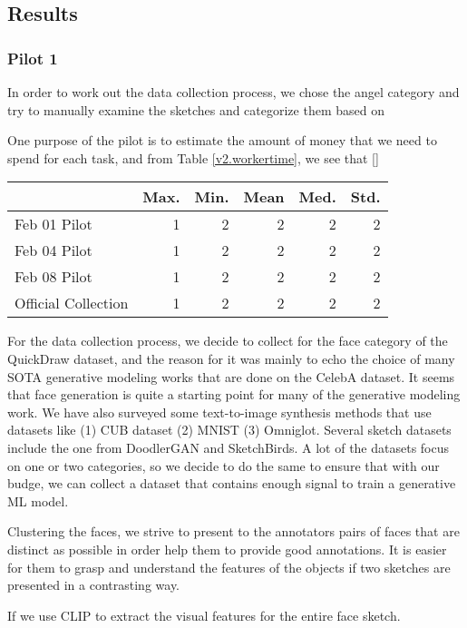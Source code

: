 
\subsection{Results}

\subsubsection{Pilot 1}
In order to work out the data collection process, we chose the angel category and try to manually examine the sketches and categorize them based on 


One purpose of the pilot is to estimate the amount of money that we need to spend for each task, and from Table \ref{v2.workertime}, we see that []
\begin{table*}[!htb]
\begin{minipage}[b]{1\textwidth}
\centering
\begin{tabular}{l|rrrrr}
\toprule
~ & Max. & Min. & Mean & Med. & Std. \\
\midrule
Feb 01 Pilot  & 1 & 2 & 2 & 2 & 2   \\
Feb 04 Pilot  & 1 & 2 & 2 & 2 & 2  \\
Feb 08 Pilot  & 1 & 2 & 2 & 2 & 2  \\
Official Collection  & 1 & 2 & 2 & 2 & 2  \\
\bottomrule
\end{tabular}
\caption{Comparing time statistics of pilot task}
\label{v2.workertime}
\end{minipage}
\end{table*}

For the data collection process, we decide to collect for the face category of the QuickDraw dataset, and the reason for it was mainly to echo the choice of many SOTA generative modeling works that are done on the CelebA dataset. It seems that face generation is quite a starting point for many of the generative modeling work. We have also surveyed some text-to-image synthesis methods that use datasets like (1) CUB dataset (2) MNIST (3) Omniglot. Several sketch datasets include the one from DoodlerGAN and SketchBirds. A lot of the datasets focus on one or two categories, so we decide to do the same to ensure that with our budge, we can collect a dataset that contains enough signal to train a generative ML model. 

Clustering the faces, we strive to present to the annotators pairs of faces that are distinct as possible in order help them to provide good annotations. It is easier for them to grasp and understand the features of the objects if two sketches are presented in a contrasting way. 



If we use CLIP to extract the visual features for the entire face sketch.

